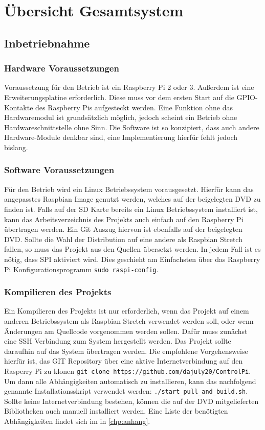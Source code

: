 \section{Übersicht Gesamtsystem}\label{kap:ausw}
 \subsection{Inbetriebnahme}
 \subsubsection{Hardware Voraussetzungen}
 Voraussetzung für den Betrieb ist ein Raspberry Pi 2 oder 3. Außerdem ist eine Erweiterungsplatine \cite{URL:PiFaceDigital2} erforderlich. Diese muss vor dem ersten Start auf die GPIO-Kontakte des Raspberry Pis aufgesteckt werden. Eine Funktion ohne das Hardwaremodul ist grundsätzlich möglich, jedoch scheint ein Betrieb ohne Hardwareschnittstelle ohne Sinn. Die Software ist so konzipiert, dass auch andere Hardware-Module denkbar sind, eine Implementierung hierfür fehlt jedoch bislang.     
 \subsubsection{Software Voraussetzungen}
 Für den Betrieb wird ein Linux Betriebssystem vorausgesetzt. Hierfür kann das angepasstes Raspbian\cite{URL:Raspian} Image genutzt werden, welches auf der beigelegten DVD zu finden ist. Falls auf der SD Karte bereits ein Linux Betriebssystem installiert ist, kann das Arbeitsverzeichnis des Projekts auch einfach auf den Raspberry Pi übertragen werden. Ein Git Auszug hiervon ist ebenfalls auf der beigelegten DVD. Sollte die Wahl der Distribution auf eine andere als Raspbian Stretch\cite{URL:Raspian} fallen, so muss das Projekt aus den Quellen übersetzt werden. In jedem Fall ist es nötig, dass SPI aktiviert wird. Dies geschieht am Einfachsten über das Raspberry Pi Konfigurationsprogramm \texttt{sudo raspi-config}.\cite{URL:EnableSPI}  
 \subsubsection{Kompilieren des Projekts}
 Ein Kompilieren des Projekts ist nur erforderlich, wenn das Projekt auf einem anderen Betriebssystem als Raspbian Stretch\cite{URL:Raspian} verwendet werden soll, oder wenn Änderungen am Quellcode vorgenommen werden sollen. Dafür muss zunächst eine SSH Verbindung zum System hergestellt werden. Das Projekt sollte daraufhin auf das System übertragen werden. Die empfohlene Vorgehensweise hierfür ist, das GIT Repository über eine aktive Internetverbindung auf den Rasperry Pi zu klonen \texttt{git clone https://github.com/dajuly20/ControlPi}. Um dann alle Abhängigkeiten automatisch zu installieren, kann das nachfolgend genannte Installationsskript verwendet werden: \texttt{./start\_pull\_and\_build.sh}. Sollte keine Internetverbindung bestehen, können die auf der DVD mitgelieferten Bibliotheken auch manuell installiert werden. 
 Eine Liste der benötigten Abhängigkeiten findet sich im  in \autoref{chp:anhang}.  

